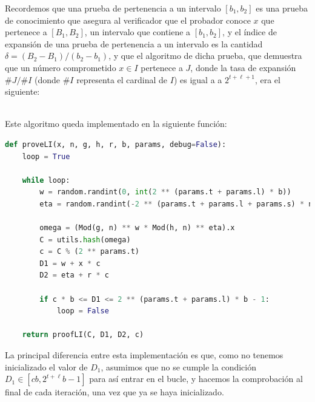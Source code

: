 Recordemos que una prueba de pertenencia a un intervalo $[b_{1}, b_{2}]$ es una prueba de conocimiento que asegura al verificador que el probador conoce $x$ que pertenece a $[B_{1}, B_{2}]$, un intervalo que contiene a $[b_{1}, b_{2}]$, y el índice de expansión de una prueba de pertenencia a un intervalo es la cantidad $\delta = (B_{2} - B_{1})/(b_{2} - b_{1})$, y que el algoritmo de dicha prueba, que demuestra que un número comprometido $x \in I$ pertenece a $J$, donde la tasa de expansión $\#J/\#I$ (donde $\#I$ representa el cardinal de $I$) es igual a a $2^{t+\ell+1}$, era el siguiente: \\
\begin{minipage}{0.9\textwidth}
    \begin{algorithm}[H]
        \caption{Prueba de intervalo mayor: $\operatorname{Prove_{LI}}$}


    \end{algorithm}
\end{minipage} \\
Este algoritmo queda implementado en la siguiente función:
\begin{lstlisting}[language=Python, basicstyle=\footnotesize]
def proveLI(x, n, g, h, r, b, params, debug=False):
    loop = True

    while loop:
        w = random.randint(0, int(2 ** (params.t + params.l) * b))
        eta = random.randint(-2 ** (params.t + params.l + params.s) * n + 1, 2 ** (params.t + params.l + params.s) * n - 1)

        omega = (Mod(g, n) ** w * Mod(h, n) ** eta).x
        C = utils.hash(omega)
        c = C % (2 ** params.t)
        D1 = w + x * c
        D2 = eta + r * c

        if c * b <= D1 <= 2 ** (params.t + params.l) * b - 1:
            loop = False

    return proofLI(C, D1, D2, c)
\end{lstlisting}
La principal diferencia entre esta implementación es que, como no tenemos inicializado el valor de $D_{1}$, asumimos que no se cumple la condición $D_{1} \in [cb, 2^{t+\ell}b -1]$ para así entrar en el bucle, y hacemos la comprobación al final de cada iteración, una vez que ya se haya inicializado.

